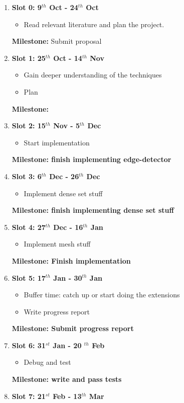 \begin{enumerate}

\item {\bf Slot 0: 9$^{th}$ Oct - 24$^{th}$ Oct}
	\begin{itemize}
		\item Read relevant literature and plan the project.
	\end{itemize}
	{\bf Milestone:} Submit proposal
\item {\bf Slot 1: 25$^{th}$ Oct - 14$^{th}$ Nov}
	\begin{itemize}
		\item Gain deeper understanding of the techniques
		\item Plan
	\end{itemize}
	{\bf Milestone:} 
\item {\bf Slot 2: 15$^{th}$ Nov  - 5$^{th}$ Dec}
	\begin{itemize}
		\item Start implementation 
	\end{itemize}
	{\bf Milestone: finish implementing edge-detector} 
\item {\bf Slot 3: 6$^{th}$ Dec -  26$^{th}$ Dec}
	\begin{itemize}
		\item Implement dense set stuff
	\end{itemize}
	{\bf Milestone: finish implementing dense set stuff} 
\item {\bf Slot 4: 27$^{th}$ Dec - 16$^{th}$ Jan}
	\begin{itemize}
		\item Implement mesh stuff
	\end{itemize}
	{\bf Milestone: Finish implementation} 
\item {\bf Slot 5: 17$^{th}$ Jan  - 30$^{th}$ Jan}
	\begin{itemize}
		\item Buffer time: catch up or start doing the extensions
		\item Write progress report
	\end{itemize}
	{\bf Milestone: Submit progress report} 
\item {\bf Slot 6: 31$^{st}$ Jan - 20 $^{th}$ Feb}
	\begin{itemize}
		\item Debug and test
	\end{itemize}
	{\bf Milestone: write and pass tests} 
\item {\bf Slot 7: 21$^{st}$ Feb - 13$^{th}$ Mar}
	\begin{itemize}

\end{itemize}
\end{enumerate}
